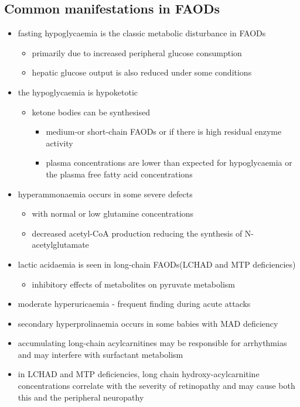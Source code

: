 \documentclass{scrartcl}
\begin{document}
\subsection{Common manifestations in FAODs}
\label{sec:org140ed33}
\begin{itemize}
\item fasting hypoglycaemia is the classic metabolic disturbance in FAODs
\begin{itemize}
\item primarily due to increased peripheral glucose consumption
\item hepatic glucose output is also reduced under some conditions
\end{itemize}
\item the hypoglycaemia is hypoketotic
\begin{itemize}
\item ketone bodies can be synthesised
\begin{itemize}
\item medium-or short-chain FAODs or if there is high residual enzyme activity
\item plasma concentrations are lower than expected for hypoglycaemia or the plasma free fatty acid concentrations
\end{itemize}
\end{itemize}
\item hyperammonaemia occurs in some severe defects
\begin{itemize}
\item with normal or low glutamine concentrations
\item decreased acetyl-CoA production reducing the synthesis of N-acetylglutamate
\end{itemize}
\item lactic acidaemia is seen in long-chain FAODs(LCHAD and MTP deficiencies)
\begin{itemize}
\item inhibitory effects of metabolites on pyruvate metabolism
\end{itemize}
\item moderate hyperuricaemia - frequent finding during acute attacks
\item secondary hyperprolinaemia occurs in some babies with MAD deficiency
\item accumulating long-chain acylcarnitines may be responsible for
arrhythmias and may interfere with surfactant metabolism
\item in LCHAD and MTP deficiencies, long chain hydroxy-acylcarnitine
concentrations correlate with the severity of retinopathy and may
cause both this and the peripheral neuropathy
\end{itemize}
\end{document}
